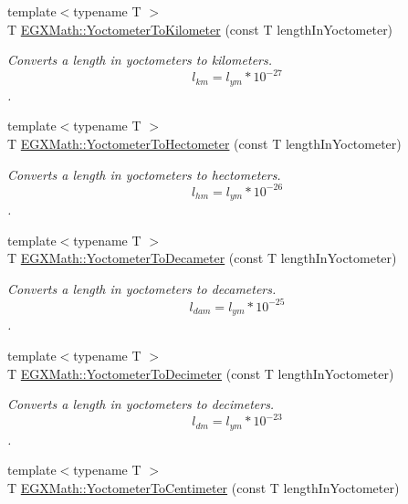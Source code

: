 \begin{DoxyCompactItemize}
{\footnotesize template$<$typename T $>$ }\\T \mbox{\hyperlink{group___e_g_x_math-_conversions-_length_conversions-_s_i-_yoctometer-_s_i_ga5736155a6aad5dc3b7b98706bda51484}{E\+G\+X\+Math\+::\+Yoctometer\+To\+Kilometer}} (const T length\+In\+Yoctometer)
\begin{DoxyCompactList}\small\item\em Converts a length in yoctometers to kilometers. \[ l_{km}=l_{ym} * 10^{-27} \]. \end{DoxyCompactList}\item 
{\footnotesize template$<$typename T $>$ }\\T \mbox{\hyperlink{group___e_g_x_math-_conversions-_length_conversions-_s_i-_yoctometer-_s_i_ga3f2a47723b097c9c2b38edf4ca14ff03}{E\+G\+X\+Math\+::\+Yoctometer\+To\+Hectometer}} (const T length\+In\+Yoctometer)
\begin{DoxyCompactList}\small\item\em Converts a length in yoctometers to hectometers. \[ l_{hm}=l_{ym} * 10^{-26} \]. \end{DoxyCompactList}\item 
{\footnotesize template$<$typename T $>$ }\\T \mbox{\hyperlink{group___e_g_x_math-_conversions-_length_conversions-_s_i-_yoctometer-_s_i_ga63fd1a1af694ca9e3afdefb16cbeffd8}{E\+G\+X\+Math\+::\+Yoctometer\+To\+Decameter}} (const T length\+In\+Yoctometer)
\begin{DoxyCompactList}\small\item\em Converts a length in yoctometers to decameters. \[ l_{dam}=l_{ym} * 10^{-25} \]. \end{DoxyCompactList}\item 
{\footnotesize template$<$typename T $>$ }\\T \mbox{\hyperlink{group___e_g_x_math-_conversions-_length_conversions-_s_i-_yoctometer-_s_i_ga958e0eaa8ecc89db32a3f8189136360c}{E\+G\+X\+Math\+::\+Yoctometer\+To\+Decimeter}} (const T length\+In\+Yoctometer)
\begin{DoxyCompactList}\small\item\em Converts a length in yoctometers to decimeters. \[ l_{dm}=l_{ym} * 10^{-23} \]. \end{DoxyCompactList}\item 
{\footnotesize template$<$typename T $>$ }\\T \mbox{\hyperlink{group___e_g_x_math-_conversions-_length_conversions-_s_i-_yoctometer-_s_i_ga38e9c49d57f1e2af4ff3a8cdb460fe7c}{E\+G\+X\+Math\+::\+Yoctometer\+To\+Centimeter}} (const T length\+In\+Yoctometer)

\end{DoxyCompactItemize}
